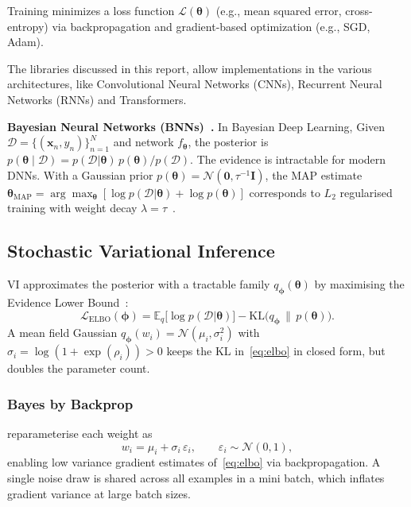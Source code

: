 \documentclass[conference]{IEEEtran}
\newcommand{\btheta}{\bm{\theta}}
\newcommand{\cD}{\mathcal{D}}
\newcommand{\cN}{\mathcal{N}}
\newcommand{\KL}{\mathrm{KL}}
\newcommand{\ELBO}{\mathcal{L}_{\text{ELBO}}}
\newcommand{\MAP}{\text{MAP}}
\begin{document}
Training minimizes a loss function $\mathcal{L}(\btheta)$ (e.g., mean squared
error, cross-entropy) via backpropagation and
gradient-based optimization (e.g., SGD, Adam).

The libraries discussed in this report, allow implementations in the various architectures, like
Convolutional Neural Networks (CNNs), Recurrent Neural Networks (RNNs) and Transformers.

\textbf{Bayesian Neural Networks (BNNs)~\citep{goan2020bayesian,murphy2023pml}.} In Bayesian Deep Learning, Given $\cD = \{(\bm{x}_n, y_n)\}_{n=1}^{N}$ and network $f_{\btheta}$, the posterior is $p(\btheta \mid \cD) = p(\cD|\btheta)\,p(\btheta)/p(\cD)$. The evidence is intractable for modern DNNs. With a Gaussian prior
$p(\btheta)=\cN(\bm{0},\tau^{-1}\mathbf{I})$, the MAP estimate $\btheta_{\MAP} = \arg\max_{\btheta}[\log p(\cD|\btheta)+\log p(\btheta)]$
corresponds to $L_2$ regularised training with weight decay
$\lambda=\tau$~\citep{murphy2023pml}.

\subsection{Stochastic Variational Inference}

VI approximates the posterior with a tractable family $q_{\bm\phi}(\btheta)$
by maximising the Evidence Lower Bound~\citep{blundell2015weight,goan2020bayesian}:
\begin{equation}
	\ELBO(\bm\phi)
	= \mathbb{E}_{q}\!\bigl[\log p(\cD|\btheta)\bigr]
	- \KL\bigl(q_{\bm\phi}\,\|\,p(\btheta)\bigr).
	\label{eq:elbo}
\end{equation}
A mean field Gaussian $q_{\bm\phi}(w_i) = \cN(\mu_i,\sigma_i^2)$ with
$\sigma_i = \log(1+\exp(\rho_i))>0$ keeps the KL in~\eqref{eq:elbo} in
closed form, but doubles the parameter count.

\subsubsection{Bayes by Backprop}

\citet{blundell2015weight} reparameterise each weight as
\begin{equation}
	w_i = \mu_i + \sigma_i\,\varepsilon_i, \qquad \varepsilon_i\sim\cN(0,1),
\end{equation}
enabling low variance gradient estimates of~\eqref{eq:elbo} via
backpropagation.
A single noise draw is shared across all examples in a
mini batch, which inflates gradient variance at large batch sizes.
\end{document}
